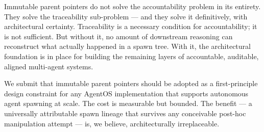 Immutable parent pointers do not solve the accountability problem in its entirety. They solve the traceability sub-problem — and they solve it definitively, with architectural certainty. Traceability is a necessary condition for accountability; it is not sufficient. But without it, no amount of downstream reasoning can reconstruct what actually happened in a spawn tree. With it, the architectural foundation is in place for building the remaining layers of accountable, auditable, aligned multi-agent systems.

We submit that immutable parent pointers should be adopted as a first-principle design constraint for any AgentOS implementation that supports autonomous agent spawning at scale. The cost is measurable but bounded. The benefit — a universally attributable spawn lineage that survives any conceivable post-hoc manipulation attempt — is, we believe, architecturally irreplaceable.

% 
% 

